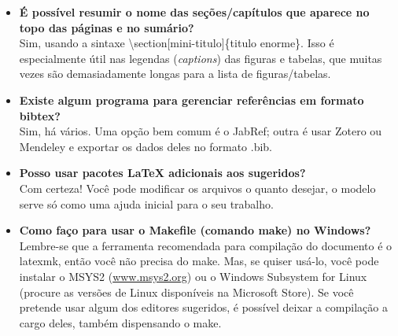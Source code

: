 \begin{itemize}
\item \textbf{É possível resumir o nome das seções/capítulos que aparece no topo das páginas e no sumário?}\\
Sim, usando a sintaxe \textsf{\textbackslash{}section[mini-titulo]\{titulo enorme\}}. Isso é especialmente útil nas legendas (\textit{captions}) das figuras e tabelas, que muitas vezes são demasiadamente longas para a lista de figuras/tabelas.

\item \textbf{Existe algum programa para gerenciar referências em formato bibtex?}\\
Sim, há vários. Uma opção bem comum é o JabRef; outra é usar Zotero ou Mendeley e exportar os dados deles no formato .bib.

\item \textbf{Posso usar pacotes \LaTeX{} adicionais aos sugeridos?}\\
Com certeza! Você pode modificar os arquivos o quanto desejar, o modelo serve só como uma ajuda inicial para o seu trabalho.

\item \textbf{Como faço para usar o Makefile (comando make) no Windows?}\\
Lembre-se que a ferramenta recomendada para compilação do documento é o \textsf{latexmk}, então você não precisa do \textsf{make}. Mas, se quiser usá-lo, você pode instalar o MSYS2 (\url{www.msys2.org}) ou o Windows Subsystem for Linux (procure as versões de Linux disponíveis na Microsoft Store). Se você pretende usar algum dos editores sugeridos, é possível deixar a compilação a cargo deles, também dispensando o \textsf{make}.

\end{itemize}
